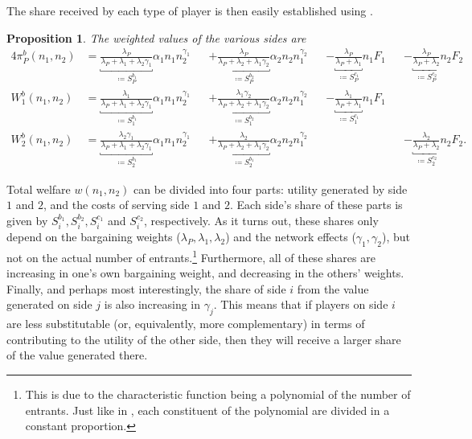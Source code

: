 \documentclass[a4paper]{article}
\newtheorem{proposition}{Proposition}
\begin{document}
The share received by each type of player is then easily established using .
\begin{proposition}
    \label{prop:bargaining_entry_fees}
    The weighted values of the various sides are
    \begin{alignat*}{4}
        \pi_P^b(n_1, n_2) &= \underbracket{\frac{\lambda_P}{\lambda_P + \lambda_1 + \lambda_2\gamma_1}}_{\coloneqq S_P^{b_1}} \alpha_1 n_1 n_2^{\gamma_1} &&+ \underbracket{\frac{\lambda_P}{\lambda_P + \lambda_2 + \lambda_1\gamma_2}}_{\coloneqq S_P^{b_2}} \alpha_2 n_2 n_1^{\gamma_2} &&- \underbracket{\frac{\lambda_P}{\lambda_P + \lambda_1}}_{\coloneqq S_P^{c_1}} n_1 F_1 &&- \underbracket{\frac{\lambda_P}{\lambda_P + \lambda_2}}_{\coloneqq S_P^{c_2}} n_2 F_2 \\
        W_1^b(n_1, n_2) &= \underbracket{\frac{\lambda_1}{\lambda_P + \lambda_1 + \lambda_2\gamma_1}}_{\coloneqq S_1^{b_1}} \alpha_1 n_1 n_2^{\gamma_1} &&+ \underbracket{\frac{\lambda_1 \gamma_2}{\lambda_P + \lambda_2 + \lambda_1\gamma_2}}_{\coloneqq S_1^{b_2}}  \alpha_2 n_2 n_1^{\gamma_2} &&- \underbracket{\frac{\lambda_1}{\lambda_P + \lambda_1}}_{\coloneqq S_1^{c_1}} n_1 F_1 && \\
        W_2^b(n_1, n_2) &= \underbracket{\frac{\lambda_2\gamma_1}{\lambda_P + \lambda_1 + \lambda_2\gamma_1}}_{\coloneqq S_2^{b_1}} \alpha_1 n_1 n_2^{\gamma_1} &&+ \underbracket{\frac{\lambda_2}{\lambda_P + \lambda_2 + \lambda_1\gamma_2}}_{\coloneqq S_2^{b_1}} \alpha_2 n_2 n_1^{\gamma_2} && &&- \underbracket{\frac{\lambda_2}{\lambda_P + \lambda_2}}_{\coloneqq S_2^{c_2}} n_2 F_2.
    \end{alignat*}
\end{proposition}

Total welfare $w(n_1, n_2)$ can be divided into four parts: utility generated by side $1$ and $2$, and the costs of serving side $1$ and $2$.
Each side's share of these parts is given by $S_i^{b_1}, S_i^{b_2}, S_i^{c_1}$ and $S_i^{c_2}$, respectively.
As it turns out, these shares only depend on the bargaining weights ($\lambda_P, \lambda_1, \lambda_2$) and the network effects ($\gamma_1, \gamma_2$), but not on the actual number of entrants.\footnote{
    This is due to the characteristic function being a polynomial of the number of entrants.
    Just like in , each constituent of the polynomial are divided in a constant proportion.
}
Furthermore, all of these shares are increasing in one's own bargaining weight, and decreasing in the others' weights.
Finally, and perhaps most interestingly, the share of side $i$ from the value generated on side $j$ is also increasing in $\gamma_j$.
This means that if players on side $i$ are less substitutable (or, equivalently, more complementary) in terms of contributing to the utility of the other side, then they will receive a larger share of the value generated there.
\end{document}

